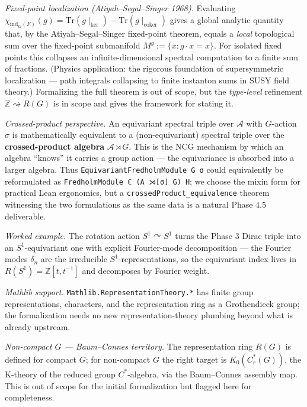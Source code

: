 \documentclass[
  11pt,
]{article}
\begin{document}
\emph{Fixed-point localization (Atiyah--Segal--Singer 1968).} Evaluating
\(\chi_{\mathrm{ind}_G(F)}(g) = \mathrm{Tr}(g\mid_{\ker}) - \mathrm{Tr}(g\mid_{\mathrm{coker}})\)
gives a global analytic quantity that, by the Atiyah--Segal--Singer
fixed-point theorem, equals a \emph{local} topological sum over the
fixed-point submanifold \(M^g := \{x : g \cdot x = x\}\). For isolated
fixed points this collapses an infinite-dimensional spectral computation
to a finite sum of fractions. (Physics application: the rigorous
foundation of supersymmetric localization --- path integrals collapsing
to finite instanton sums in SUSY field theory.) Formalizing the full
theorem is out of scope, but the \emph{type-level} refinement
\(\mathbb{Z}\rightsquigarrow R(G)\) is in scope and gives the framework
for stating it.

\emph{Crossed-product perspective.} An equivariant spectral triple over
\(\mathcal{A}\) with \(G\)-action \(\sigma\) is mathematically
equivalent to a (non-equivariant) spectral triple over the
\textbf{crossed-product algebra} \(\mathcal{A}\rtimes G\). This is the
NCG mechanism by which an algebra ``knows'' it carries a group action
--- the equivariance is absorbed into a larger algebra. Thus
\texttt{EquivariantFredholmModule\ G\ σ} could equivalently be
reformulated as \texttt{FredholmModule\ ℂ\ (A\ ⋊{[}σ{]}\ G)\ H}; we
choose the mixin form for practical Lean ergonomics, but a
\texttt{crossedProduct\_equivalence} theorem witnessing the two
formulations as the same data is a natural Phase 4.5 deliverable.

\emph{Worked example.} The rotation action \(S^1 \curvearrowright S^1\)
turns the Phase 3 Dirac triple into an \(S^1\)-equivariant one with
explicit Fourier-mode decomposition --- the Fourier modes \(\delta_n\)
are the irreducible \(S^1\)-representations, so the equivariant index
lives in \(R(S^1) = \mathbb{Z}[t, t^{-1}]\) and decomposes by Fourier
weight.

\emph{Mathlib support.} \texttt{Mathlib.RepresentationTheory.*} has
finite group representations, characters, and the representation ring as
a Grothendieck group; the formalization needs no new
representation-theory plumbing beyond what is already upstream.

\emph{Non-compact \(G\) --- Baum--Connes territory.} The representation
ring \(R(G)\) is defined for compact \(G\); for non-compact \(G\) the
right target is \(K_0(C^*_r(G))\), the K-theory of the reduced group
\(C^*\)-algebra, via the Baum--Connes assembly map. This is out of scope
for the initial formalization but flagged here for completeness.
\end{document}
